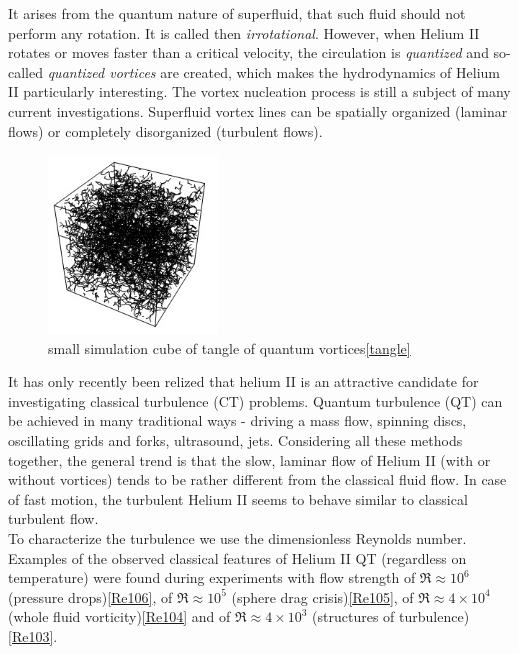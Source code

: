 	It arises from the quantum nature of superfluid, that such fluid should not perform any rotation. It is called then \textit{irrotational}. However, when Helium II rotates or moves faster than a critical velocity, the circulation is \textit{quantized} and so-called \textit{quantized vortices} are created, which makes the hydrodynamics of Helium II particularly interesting. The vortex nucleation process is still a subject of many current investigations. Superfluid vortex lines can be spatially organized (laminar flows) or completely disorganized (turbulent flows).

	\begin{figure}[h]
		\centering
		\includegraphics[width=0.4\textwidth]{graphics/theory/QT-tangle}
		\caption{small simulation cube of tangle of quantum vortices\ref{tangle}}
		\label{QT}
	\end{figure}

	It has only recently been relized that helium II is an attractive candidate for investigating classical turbulence (CT) problems. Quantum turbulence (QT) can be achieved in many traditional ways - driving a mass flow, spinning discs, oscillating grids and forks, ultrasound, jets. Considering all these methods together, the general trend is that the slow, laminar flow of Helium II (with or without vortices) tends to be rather different from the classical fluid flow. In case of fast motion, the turbulent Helium II seems to behave similar to classical turbulent flow.\\
	To characterize the turbulence we use the dimensionless Reynolds number. Examples of the observed classical features of Helium II QT (regardless on temperature) were found during experiments with flow strength of $\Re \approx 10^6$ (pressure drops)\ref{Re106}, of $\Re \approx 10^5$ (sphere drag crisis)\ref{Re105}, of $\Re \approx 4 \times 10^4$ (whole fluid vorticity)\ref{Re104} and of $\Re \approx 4 \times 10^3$ (structures of turbulence)\ref{Re103}.

